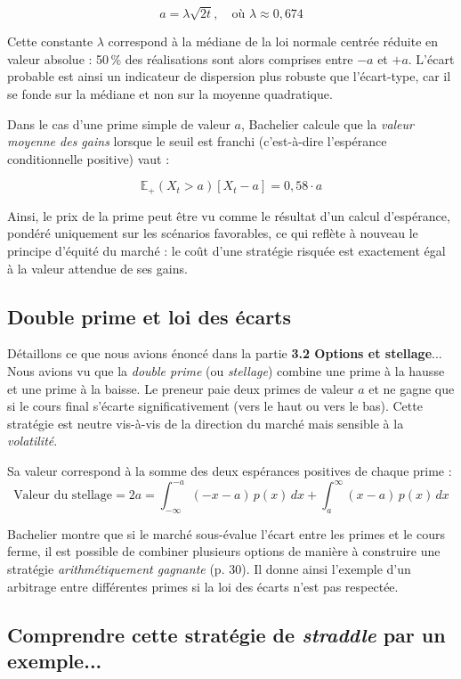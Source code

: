 \documentclass[12pt,a4paper]{article}
\begin{document}
\[
a = \lambda \sqrt{2t}, \quad \text{où } \lambda \approx 0{,}674
\]

Cette constante \( \lambda \) correspond à la médiane de la loi normale centrée réduite en valeur absolue : 50\,\% des réalisations sont alors comprises entre \( -a \) et \( +a \). L’écart probable est ainsi un indicateur de dispersion plus robuste que l’écart-type, car il se fonde sur la médiane et non sur la moyenne quadratique.

Dans le cas d’une prime simple de valeur \( a \), Bachelier calcule que la \textit{valeur moyenne des gains} lorsque le seuil est franchi (c’est-à-dire l’espérance conditionnelle positive) vaut :

\[
\mathbb{E}_+(X_t > a)[X_t - a] = 0{,}58 \cdot a
\]

Ainsi, le prix de la prime peut être vu comme le résultat d’un calcul d’espérance, pondéré uniquement sur les scénarios favorables, ce qui reflète à nouveau le principe d’équité du marché : le coût d’une stratégie risquée est exactement égal à la valeur attendue de ses gains.

\subsection{Double prime et loi des écarts}

Détaillons ce que nous avions énoncé dans la partie \textbf{3.2 Options et stellage}... Nous avions vu que la \textit{double prime} (ou \textit{stellage}) combine une prime à la hausse et une prime à la baisse. Le preneur paie deux primes de valeur $a$ et ne gagne que si le cours final s’écarte significativement (vers le haut ou vers le bas). Cette stratégie est neutre vis-à-vis de la direction du marché mais sensible à la \textit{volatilité}.

Sa valeur correspond à la somme des deux espérances positives de chaque prime :
\[
\text{Valeur du stellage} = 2a = \int_{-\infty}^{-a} (-x - a)\, p(x)\, dx + \int_a^{\infty} (x - a)\, p(x)\, dx
\]

Bachelier montre que si le marché sous-évalue l’écart entre les primes et le cours ferme, il est possible de combiner plusieurs options de manière à construire une stratégie \textit{arithmétiquement gagnante} (p. 30). Il donne ainsi l’exemple d’un arbitrage entre différentes primes si la loi des écarts n’est pas respectée.

\subsection{Comprendre cette stratégie de \textit{straddle} par un exemple...}
\end{document}
